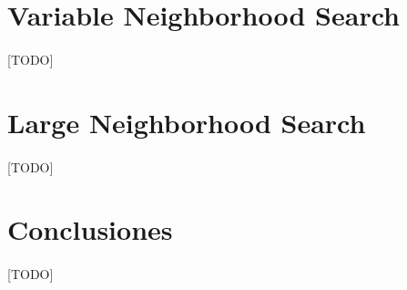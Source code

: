 \documentclass{subfiles}
\begin{document}
    \section{Variable Neighborhood Search}
    \label{sec:metaheuristics_vns}

      \paragraph{}
      [TODO]

    \section{Large Neighborhood Search}
    \label{sec:metaheuristics_lns}

      \paragraph{}
      [TODO]

    \section{Conclusiones}
    \label{sec:metaheuristics_conclusions}

      \paragraph{}
      [TODO]
\end{document}
